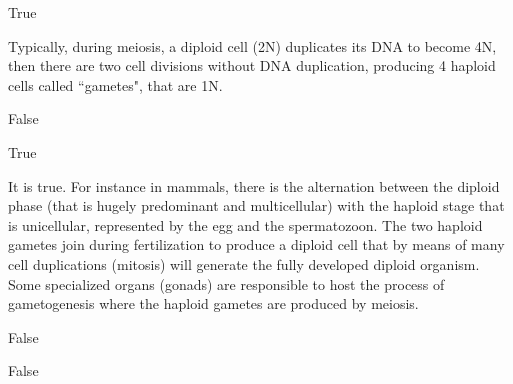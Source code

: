 \begin{Answer} [
   ref={ex7},
   number={7}
 ]

  \Question True

\end{Answer}

\begin{Answer} [
   ref={ex8},
   number={8}
 ]


Typically, during meiosis,  a diploid cell (2N) duplicates its DNA to become
4N, then there are two cell divisions without DNA duplication, producing 4
haploid cells called “gametes", that are 1N.

\end{Answer}

\begin{Answer} [
   ref={ex9},
   number={9}
 ]

  \Question False

\end{Answer}

\begin{Answer} [
   ref={ex10},
   number={10}
 ]


\end{Answer}

\begin{Answer} [
   ref={ex11},
   number={11}
 ]

  \Question True

It is true. For instance in mammals, there is the alternation between the
diploid phase (that is hugely predominant and multicellular) with the haploid
stage that is unicellular, represented by the egg and the spermatozoon.
The two haploid gametes join during fertilization to produce a diploid cell
that by means of many cell duplications (mitosis) will generate the fully
developed diploid organism.
Some specialized organs (gonads) are responsible to host the process of
gametogenesis where the haploid gametes are produced by meiosis.  

\end{Answer}

\begin{Answer} [
   ref={ex12},
   number={12}
 ]

  \Question False

\end{Answer}

\begin{Answer} [
   ref={ex13},
   number={13}
 ]

  \Question False

\end{Answer}
